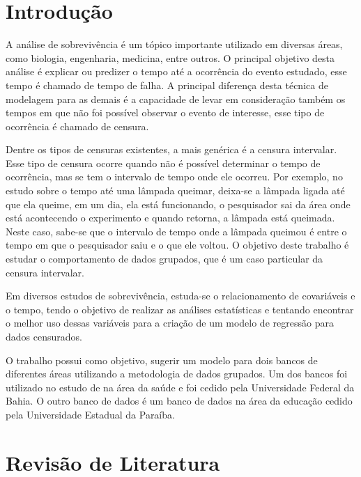 \documentclass[a4paper,12pt]{article}
\newcommand*\NewPage{\newpage\null\newpage}
\begin{document}
 \NewPage

\tableofcontents
\NewPage

\newpage
\pagestyle{plain}
\section{Introdução}
\noindent

A análise de sobrevivência é um tópico importante utilizado em diversas áreas, como biologia, engenharia, medicina, entre outros. O principal objetivo desta análise é explicar ou predizer o tempo até a ocorrência do evento estudado, esse tempo é chamado de tempo de falha. A principal diferença desta técnica de modelagem para as demais é a capacidade de levar em consideração também os tempos em que não foi possível observar o evento de interesse, esse tipo de ocorrência é chamado de censura.

Dentre os tipos de censuras existentes, a mais genérica é a censura intervalar. Esse tipo de censura ocorre quando não é possível determinar o tempo de ocorrência, mas se tem o intervalo de tempo onde ele ocorreu. Por exemplo, no estudo sobre o tempo até uma lâmpada queimar, deixa-se a lâmpada ligada até que ela queime, em um dia, ela está funcionando, o pesquisador sai da área onde está acontecendo o experimento e quando retorna, a lâmpada está queimada. Neste caso, sabe-se que o intervalo de tempo onde a lâmpada queimou é entre o tempo em que o pesquisador saiu e o que ele voltou. O objetivo deste trabalho é estudar o comportamento de dados grupados, que é um caso particular da censura intervalar.

Em diversos estudos de sobrevivência, estuda-se o relacionamento de covariáveis e o tempo, tendo o objetivo de realizar as análises estatísticas e tentando encontrar o melhor uso dessas variáveis para a criação de um modelo de regressão para dados censurados.

O trabalho possui como objetivo, sugerir um modelo para dois bancos de diferentes áreas utilizando a metodologia de dados grupados. Um dos bancos foi utilizado no estudo de \cite{Barreto} na área da saúde e foi cedido pela Universidade Federal da Bahia. O outro banco de dados é um banco de dados na área da educação cedido pela Universidade Estadual da Paraíba.
\newpage
\section{Revisão de Literatura}
\end{document}
